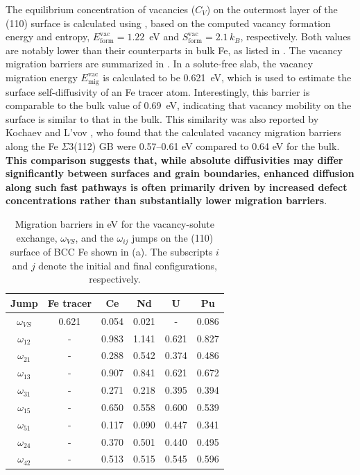 \documentclass[preprint,12pt]{elsarticle}
\providecommand{\DIFaddtex}[1]{{\bf #1}} %
\providecommand{\DIFdeltex}[1]{} %
\providecommand{\DIFaddbegin}{\protect\color{blue}} %
\providecommand{\DIFaddend}{\protect\color{black}} %
\providecommand{\DIFdelbegin}{\protect\color{red}} %
\providecommand{\DIFdelend}{\protect\color{black}} %
\providecommand{\DIFadd}[1]{\texorpdfstring{\DIFaddtex{#1}}{#1}} %
\providecommand{\DIFdel}[1]{\texorpdfstring{\DIFdeltex{#1}}{}} %
\newcommand{\DIFscaledelfig}{0.5}
\newlength{\DIFdelgraphicswidth} %
\newlength{\DIFdelgraphicsheight} %
\newcommand{\DIFaddincludegraphics}[2][]{{\color{blue}\fbox{\DIFOincludegraphics[#1]{#2}}}} %
\newcommand{\DIFdelincludegraphics}[2][]{%
\sbox{\DIFdelgraphicsbox}{\DIFOincludegraphics[#1]{#2}}%
\settoboxwidth{\DIFdelgraphicswidth}{\DIFdelgraphicsbox} %
\settoboxtotalheight{\DIFdelgraphicsheight}{\DIFdelgraphicsbox} %
\scalebox{\DIFscaledelfig}{%
\parbox[b]{\DIFdelgraphicswidth}{\usebox{\DIFdelgraphicsbox}\\[-\baselineskip] \rule{\DIFdelgraphicswidth}{0em}}\llap{\resizebox{\DIFdelgraphicswidth}{\DIFdelgraphicsheight}{%
\setlength{\unitlength}{\DIFdelgraphicswidth}%
\begin{picture}(1,1)%
\thicklines\linethickness{2pt} %
{\color[rgb]{1,0,0}\put(0,0){\framebox(1,1){}}}%
{\color[rgb]{1,0,0}\put(0,0){\line( 1,1){1}}}%
{\color[rgb]{1,0,0}\put(0,1){\line(1,-1){1}}}%
\end{picture}%
}\hspace*{3pt}}} %
} %
\DeclareRobustCommand{\DIFaddbegin}{\DIFOaddbegin \let\includegraphics\DIFaddincludegraphics} %
\DeclareRobustCommand{\DIFaddend}{\DIFOaddend \let\includegraphics\DIFOincludegraphics} %
\DeclareRobustCommand{\DIFdelbegin}{\DIFOdelbegin \let\includegraphics\DIFdelincludegraphics} %
\DeclareRobustCommand{\DIFdelend}{\DIFOaddend \let\includegraphics\DIFOincludegraphics} %
\begin{document}
The equilibrium concentration of vacancies (\( C_V \)) on the outermost layer of the (110) surface is calculated using , based on the computed vacancy formation energy and entropy, \( E_{\text{form}}^{\text{vac}} = 1.22 \)~eV and \( S_{\text{form}}^{\text{vac}} = 2.1\,k_B \), respectively. Both values are notably lower than their counterparts in bulk Fe, as listed in . The vacancy migration barriers are summarized in . In a solute-free slab, the vacancy migration energy \( E_{\text{mig}}^{\text{vac}} \) is calculated to be 0.621~eV, which is used to estimate the surface self-diffusivity of an Fe tracer atom. Interestingly, this barrier is comparable to the bulk value of 0.69~eV, indicating that vacancy mobility on the surface is similar to that in the bulk. This similarity was also reported by Kochaev and L'vov \cite{kochaev2024atomistic}, who found that the calculated vacancy migration barriers along the Fe $\Sigma3$(112) GB were 0.57–0.61 eV compared to 0.64 eV for the bulk. \DIFdelbegin \DIFdel{Thus, the enhancement in vacancy-mediated diffusion on the (110) surface compared to bulk diffusion is driven by a significantly higher vacancy concentration on the surface because \( E_{\text{form}}^{\text{vac}} \) is approximately 1~eV lower than it is in the bulk}\DIFdelend \DIFaddbegin \DIFadd{This comparison suggests that, while absolute diffusivities may differ significantly between surfaces and grain boundaries, enhanced diffusion along such fast pathways is often primarily driven by increased defect concentrations rather than substantially lower migration barriers}\DIFaddend .


\begin{table}[!ht]
    \centering
    \caption{Migration barriers in eV for the vacancy-solute exchange, $\omega_{VS}$, and the $\omega_{ij}$ jumps on the (110) surface of BCC Fe shown in (a). The subscripts $i$ and $j$ denote the initial and final configurations, respectively. }
    \begin{tabular}{|c|c|c|c|c|c|}
      \hline
      Jump &Fe tracer& Ce & Nd & U & Pu \\
      \hline
      $\omega_{VS}$&0.621&0.054 &0.021 &- &0.086  \\
      \hline
      $\omega_{12}$&-&0.983 &1.141 &0.621 &0.827 \\
      $\omega_{21}$&-&0.288 &0.542 &0.374 &0.486 \\
      \hline
      $\omega_{13}$&-&0.907 &0.841 &0.621 &0.672 \\
      $\omega_{31}$&-&0.271 &0.218 &0.395 &0.394 \\
      \hline
      $\omega_{15}$&-&0.650 &0.558 &0.600 &0.539 \\
      $\omega_{51}$&-&0.117 &0.090 &0.447 &0.341 \\ 
      \hline
      $\omega_{24}$&-&0.370 &0.501 &0.440 &0.495 \\
      $\omega_{42}$&-&0.513 &0.515 &0.545 &0.596 \\
      \hline
    \end{tabular}
    \label{tab:mig_barriers_surface}
\end{table}
\end{document}

